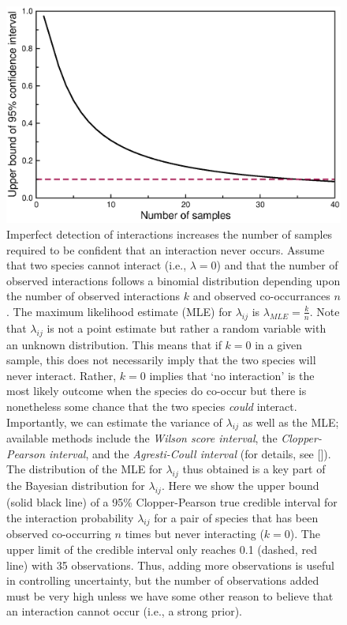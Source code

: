 \documentclass[12pt]{article}
\begin{document}
  \begin{figure}[h!]
    \caption{Imperfect detection of interactions increases the number of samples required to be confident that an interaction never occurs. Assume that two species cannot interact (i.e., $\lambda=0$) and that the number of observed interactions follows a binomial distribution depending upon the number of observed interactions $k$ and observed co-occurrances $n$. The maximum likelihood estimate (MLE) for $\lambda_{ij}$ is $\lambda_{MLE}=\frac{k}{n}$. Note that $\lambda_{ij}$ is not a point estimate but rather a random variable with an unknown distribution. This means that if $k = 0$ in a given sample, this does not necessarily imply that the two species will never interact. Rather, $k = 0$ implies that `no interaction' is the most likely outcome when the species do co-occur but there is nonetheless some chance that the two species \emph{could} interact.\\
    Importantly, we can estimate the variance of $\lambda_{ij}$ as well as the MLE; available methods include the \emph{Wilson score interval}, the \emph{Clopper-Pearson interval}, and the \emph{Agresti-Coull interval} (for details, see [\citealp{Brown2001}]). The distribution of the MLE for $\lambda_{ij}$ thus obtained is a key part of the Bayesian distribution for $\lambda_{ij}$.
    Here we show the upper bound (solid black line) of a 95\% Clopper-Pearson true credible interval for the interaction probability $\lambda_{ij}$ for a pair of species that has been observed co-occurring $n$ times but never interacting ($k = 0$). The upper limit of the credible interval only reaches 0.1 (dashed, red line) with 35 observations. Thus, adding more observations is useful in controlling uncertainty, but the number of observations added must be very high unless we have some other reason to believe that an interaction cannot occur (i.e., a strong prior).}
    \label{upper_limits}
    \begin{center}
    \includegraphics*[width=.8\textwidth]{figures/upper_limit_DG.eps}
    \end{center}
    \end{figure}
\end{document}
